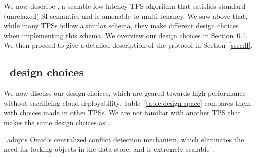 

We now describe \sysll, a scalable low-latency TPS algorithm 
that satisfies standard (unrelaxed) SI semantics and is amenable to multi-tenancy.
We saw above that, while many TPSs follow a similar schema,  they make different design choices when implementing this schema. 
We overview our design choices in Section~\ref{ssec:ll-txns}. 
We then proceed to give a detailed description of the protocol
in Section~\ref{ssec:ll}.

\subsection{\sysll\ design choices}
\label{ssec:ll-txns}

We now discuss our design choices, which are geared towards high performance without sacrificing cloud deployability.
Table~\ref{table:design-space} compares them with choices made in other TPSs. 
We are not familiar with another TPS that makes the same design choices as \sysll. 





\sysll\ adopts Omid's centralized conflict detection mechanism, which eliminates the need for locking objects
in the data store, and is extremely scalable~\cite{Omid2017}. 

